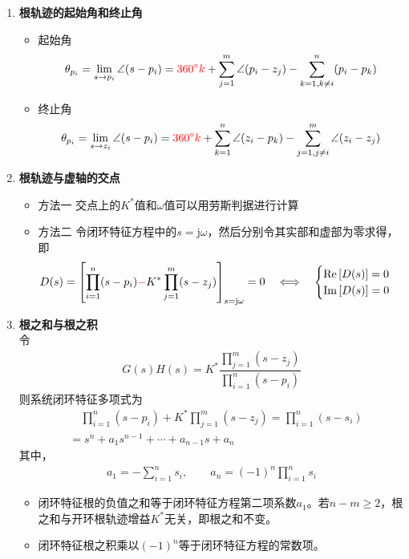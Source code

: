 \begin{enumerate}
	\item \textbf{根轨迹的起始角和终止角}
	\begin{itemize}
		\item 起始角
		\begin{align}
			\theta_{p_i} = \lim\limits_{s \to p_i} \angle (s - p_i) =  \textcolor{red}{360 {}^{\circ} k}  + \sum_{j = 1}^{m}\angle (p_i - z_j) - \sum_{k = 1, k \neq i }^{n} (p_i - p_k) 
		\end{align}
		\item 终止角
		\begin{align}
			\theta_{p_i} = \lim\limits_{s \to z_i} \angle (s - p_i) =  \textcolor{red}{360 {}^{\circ} k} + \sum_{k = 1}^{n} \angle(z_i - p_k) - \sum_{j = 1, j \neq i}^{m}\angle (z_i - z_j)
		\end{align}
	\end{itemize}
	
	
	\item \textbf{根轨迹与虚轴的交点}
	\vspace*{-1em}
	\begin{itemize}
		\item 方法一 \quad 交点上的$K^*$值和$\omega$值可以用劳斯判据进行计算
		\item 方法二 \quad 令闭环特征方程中的$s = \text{j}\omega$，然后分别令其实部和虚部为零求得，即
		\begin{align}
			D(s) = \left[\prod_{i = 1}^n (s - p_i) \textcolor{red}{-} K^* \prod_{j = 1}^{m}(s - z_j) \right]_{s=\text{j}\omega} = 0 \quad \Longleftrightarrow \quad 
			\begin{cases}
				\text{Re}\left[D(s)\right] = 0\\
				\text{Im}\left[D(s)\right] = 0
			\end{cases}
		\end{align}
	\end{itemize}
	
	
	\item \textbf{根之和与根之积}\\
	令
	\begin{align*}
		G(s)H(s) = K^* \dfrac{\displaystyle \prod_{j = 1}^m (s - z_j)}{\displaystyle \prod_{i = 1}^n (s - p_i)}
	\end{align*}
	则系统闭环特征多项式为
	\begin{align*}
		&\quad \prod_{i = 1}^n (s - p_i) + K^*\prod_{j = 1}^m (s - z_j) = \prod_{i = 1}^n(s - s_i)\\
		& = s^n + a_1 s^{n-1} + \cdots + a_{n-1}s + a_n
	\end{align*}
	其中，
	\begin{align}
		a_1 = - \sum_{i = 1}^n s_i, \quad \quad a_n = (-1)^n \prod_{i=1}^{n} s_i 
	\end{align}
	\begin{itemize}
		\item 闭环特征根的负值之和等于闭环特征方程第二项系数$a_1$。若$n - m \ge 2$，根之和与开环根轨迹增益$K^*$无关，即根之和不变。
		\item 闭环特征根之积乘以$(-1)^n$等于闭环特征方程的常数项。	
	\end{itemize}
	
\end{enumerate}

